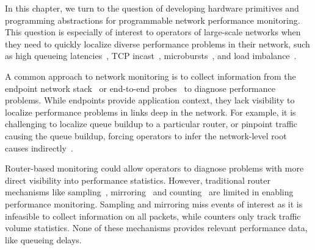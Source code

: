 
In this chapter, we turn to the question of developing hardware primitives and
programming abstractions for programmable network performance monitoring. This
question is especially of interest to operators of large-scale networks when
they need to quickly localize diverse performance problems in their network,
such as high queueing latencies~\cite{int}, TCP incast~\cite{tcpincast},
microbursts~\cite{tpp}, and load imbalance~\cite{conga}.

A common approach to network monitoring is to collect information from the
endpoint network stack~\cite{minlan-snap, dapper-sosr, pathdump, trumpet} or
end-to-end probes~\cite{pingmesh} to diagnose performance problems.  While
endpoints provide application context, they lack visibility to localize
performance problems in links deep in the network. For example, it is
challenging to localize queue buildup to a particular router, or pinpoint
traffic causing the queue buildup, forcing operators to infer the network-level
root causes indirectly~\cite{pingmesh}.

Router-based monitoring could allow operators to diagnose problems with more
direct visibility into performance statistics. However, traditional router
mechanisms like sampling~\cite{netflow, sflow}, mirroring~\cite{cisco-span,
  netsight, everflow} and counting~\cite{cormode, univmon} are limited in enabling
performance monitoring.
%
Sampling and mirroring miss events of interest as it is infeasible to collect
information on all packets, while counters only track traffic volume
statistics. None of these mechanisms provides relevant performance data, like
queueing delays.


